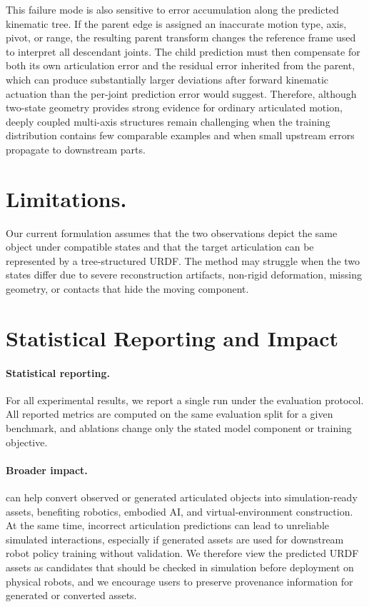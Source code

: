 This failure mode is also sensitive to error accumulation along the predicted kinematic tree.
If the parent edge is assigned an inaccurate motion type, axis, pivot, or range, the resulting parent transform changes the reference frame used to interpret all descendant joints.
The child prediction must then compensate for both its own articulation error and the residual error inherited from the parent, which can produce substantially larger deviations after forward kinematic actuation than the per-joint prediction error would suggest.
Therefore, although two-state geometry provides strong evidence for ordinary articulated motion, deeply coupled multi-axis structures remain challenging when the training distribution contains few comparable examples and when small upstream errors propagate to downstream parts.

\section{Limitations.}
Our current formulation assumes that the two observations depict the same object under compatible states and that the target articulation can be represented by a tree-structured URDF.
The method may struggle when the two states differ due to severe reconstruction artifacts, non-rigid deformation, missing geometry, or contacts that hide the moving component.

\section{Statistical Reporting and Impact}
\label{sec:supp_impl_compute_impact}

\paragraph{Statistical reporting.}
For all experimental results, we report a single run under the evaluation protocol.
All reported metrics are computed on the same evaluation split for a given benchmark, and ablations change only the stated model component or training objective.

\paragraph{Broader impact.}
\method can help convert observed or generated articulated objects into simulation-ready assets, benefiting robotics, embodied AI, and virtual-environment construction.
At the same time, incorrect articulation predictions can lead to unreliable simulated interactions, especially if generated assets are used for downstream robot policy training without validation.
We therefore view the predicted URDF assets as candidates that should be checked in simulation before deployment on physical robots, and we encourage users to preserve provenance information for generated or converted assets.

